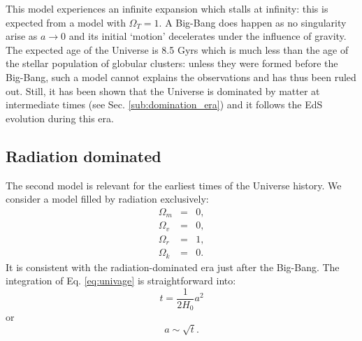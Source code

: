 This model experiences an infinite expansion which stalls at infinity: this is expected from a model with $\Omega_T=1$. A Big-Bang does happen as no singularity arise as $a\rightarrow 0$ and its initial `motion' decelerates under the influence of gravity. The expected age of the Universe is 8.5 Gyrs which is much less than the age of the stellar population of globular clusters: unless they were formed before the Big-Bang, such a model cannot explains the observations and has thus been ruled out. Still, it has been shown that the Universe is dominated by matter at intermediate times (see Sec. \ref{sub:domination_era}) and it follows the EdS evolution during this era.

\subsection{Radiation dominated} %
\label{sub:radiation_dominated}
The second model is relevant for the earliest times of the Universe history. We consider a model filled by radiation exclusively:
\begin{eqnarray}
	\Omega_m&=&0,\\
	\Omega_v&=&0,\\
	\Omega_r&=&1,\\
	\Omega_k&=&0.
\end{eqnarray}
It is consistent with the radiation-dominated era just after the Big-Bang. The integration of Eq. \ref{eq:univage} is straightforward into:
\begin{equation}
	t=\frac{1}{2H_0}a^2
\end{equation}
or
\begin{equation}
	a\sim\sqrt t.
\end{equation}

